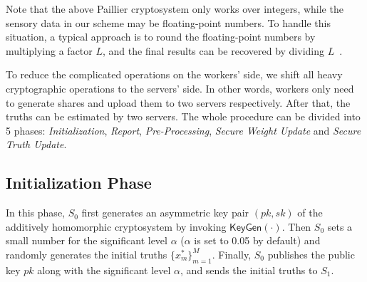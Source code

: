 \documentclass[conference]{IEEEtran}
\begin{document}
Note that the above Paillier cryptosystem only works over integers, while the sensory data in our scheme may be floating-point numbers.
To handle this situation, a typical approach is to round the floating-point numbers by multiplying a factor $L$, and the final results can be recovered by dividing $L$~\cite{zheng_learning_2018,xue_inpptd_2020}.

To reduce the complicated operations on the workers' side, we shift all heavy cryptographic operations to the servers' side.
In other words, workers only need to generate shares and upload them to two servers respectively.
After that, the truths can be estimated by two servers.
The whole procedure can be divided into 5 phases: {\em Initialization}, {\em Report}, {\em Pre-Processing}, {\em Secure Weight Update} and {\em Secure Truth Update}.

\subsection{Initialization Phase}
In this phase, $S_0$ first generates an asymmetric key pair $(pk, sk)$ of the additively homomorphic cryptosystem by invoking $\mathsf{KeyGen}(\cdot)$.
Then $S_0$ sets a small number for the significant level $\alpha$ ($\alpha$ is set to 0.05 by default) and randomly generates the initial truths $\{x_m^*\}_{m=1}^M$.
Finally, $S_0$ publishes the public key $pk$ along with the significant level $\alpha$, and sends the initial truths to $S_1$.
\end{document}
